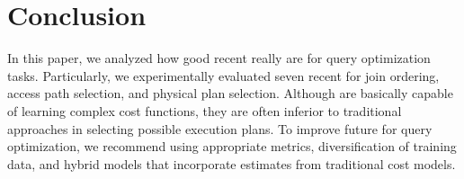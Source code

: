 \section{Conclusion} \label{sec:conclusion}
In this paper, we analyzed how good recent \lcms really are for query optimization tasks.
Particularly, we experimentally evaluated seven recent \lcms for join ordering, access path selection, and physical plan selection.
Although \lcms are basically capable of learning complex cost functions, they are often inferior to traditional approaches in selecting possible execution plans.
To improve future \lcms for query optimization, we recommend using appropriate metrics, diversification of training data, and hybrid models that incorporate estimates from traditional cost models.